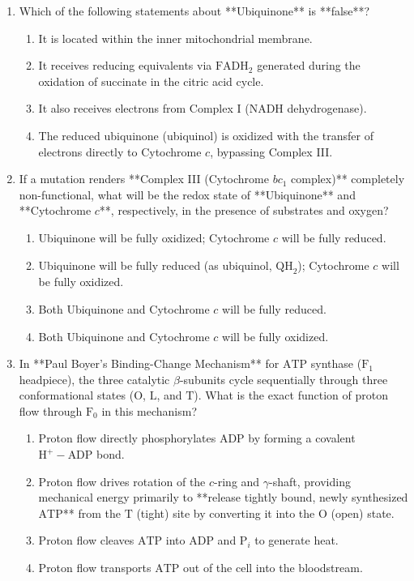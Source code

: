 \documentclass[11pt, a4paper]{article}
\begin{document}
\begin{enumerate}[label=\textbf{\arabic*.}]
\item Which of the following statements about **Ubiquinone** is **false**?
\begin{enumerate}[label=(\Alph*)]
    \item It is located within the inner mitochondrial membrane.
    \item It receives reducing equivalents via $\text{FADH}_2$ generated during the oxidation of succinate in the citric acid cycle.
    \item It also receives electrons from Complex I ($\text{NADH}$ dehydrogenase).
    \item The reduced ubiquinone (ubiquinol) is oxidized with the transfer of electrons directly to Cytochrome $c$, bypassing Complex III.
\end{enumerate}

\item If a mutation renders **Complex III (Cytochrome $bc_1$ complex)** completely non-functional, what will be the redox state of **Ubiquinone** and **Cytochrome $c$**, respectively, in the presence of substrates and oxygen?
\begin{enumerate}[label=(\Alph*)]
    \item Ubiquinone will be fully oxidized; Cytochrome $c$ will be fully reduced.
    \item Ubiquinone will be fully reduced (as ubiquinol, $\text{QH}_2$); Cytochrome $c$ will be fully oxidized.
    \item Both Ubiquinone and Cytochrome $c$ will be fully reduced.
    \item Both Ubiquinone and Cytochrome $c$ will be fully oxidized.
\end{enumerate}

\item In **Paul Boyer's Binding-Change Mechanism** for $\text{ATP}$ synthase ($\text{F}_1$ headpiece), the three catalytic $\beta$-subunits cycle sequentially through three conformational states ($\text{O}$, $\text{L}$, and $\text{T}$). What is the exact function of proton flow through $\text{F}_0$ in this mechanism?
\begin{enumerate}[label=(\Alph*)]
    \item Proton flow directly phosphorylates $\text{ADP}$ by forming a covalent $\text{H}^+-\text{ADP}$ bond.
    \item Proton flow drives rotation of the $c$-ring and $\gamma$-shaft, providing mechanical energy primarily to **release tightly bound, newly synthesized $\text{ATP}$** from the $\text{T}$ (tight) site by converting it into the $\text{O}$ (open) state.
    \item Proton flow cleaves $\text{ATP}$ into $\text{ADP}$ and $\text{P}_i$ to generate heat.
    \item Proton flow transports $\text{ATP}$ out of the cell into the bloodstream.
\end{enumerate}


\end{enumerate}
\end{document}
